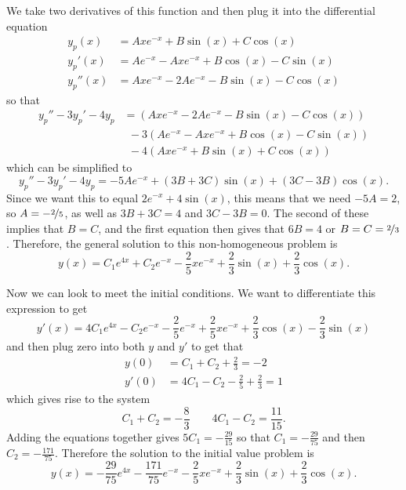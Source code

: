\begin{exampleSol}
We take two derivatives of this function and then plug it into the differential equation
\begin{equation*}
\begin{split}
y_p(x) &= Axe^{-x} + B\sin(x) + C\cos(x) \\
y_p'(x) &= Ae^{-x} - Axe^{-x} + B\cos(x) - C\sin(x) \\
y_p''(x) &= Axe^{-x} - 2Ae^{-x} - B\sin(x) - C\cos(x)
\end{split}
\end{equation*}
so that 
\begin{equation*}
\begin{split}
y_p'' - 3y_p' - 4y_p &= (Axe^{-x} - 2Ae^{-x} - B\sin(x) - C\cos(x))\\
&\ \ - 3(Ae^{-x} - Axe^{-x} + B\cos(x) - C\sin(x))\\
& \ \  - 4(Axe^{-x} + B\sin(x) + C\cos(x))
\end{split}
\end{equation*}
which can be simplified to
\begin{equation*}
y_p'' - 3y_p' - 4y_p = -5Ae^{-x} + (3B + 3C)\sin(x) + (3C - 3B)\cos(x).
\end{equation*}
Since we want this to equal $2e^{-x} + 4\sin(x)$, this means that we need $-5A = 2$, so $A = -\nicefrac{2}{5}$, as well as $3B + 3C = 4$ and $3C - 3B = 0$. The second of these implies that $B = C$, and the first equation then gives that $6B = 4$ or $B = C = \nicefrac{2}{3}$. Therefore, the general solution to this non-homogeneous problem is
\begin{equation*}
y(x) = C_1e^{4x} + C_2e^{-x} - \frac{2}{5}xe^{-x} + \frac{2}{3}\sin(x) + \frac{2}{3}\cos(x).
\end{equation*}

Now we can look to meet the initial conditions. We want to differentiate this expression to get
\begin{equation*}
y'(x) = 4C_1e^{4x} - C_2e^{-x} - \frac{2}{5}e^{-x} + \frac{2}{5}xe^{-x} + \frac{2}{3}\cos(x) - \frac{2}{3}\sin(x)
\end{equation*}
and then plug zero into both $y$ and $y'$ to get that
\begin{equation*}
\begin{split}
y(0) &= C_1 + C_2 + \frac{2}{3} = -2 \\
y'(0) &= 4C_1 - C_2 - \frac{2}{5} + \frac{2}{3} = 1
\end{split}
\end{equation*}
which gives rise to the system
\begin{equation*}
C_1 + C_2 = -\frac{8}{3} \qquad 4C_1 - C_2 = \frac{11}{15}.
\end{equation*}
Adding the equations together gives $5C_1 = - \frac{29}{15}$ so that $C_1 = -\frac{29}{75}$ and then $C_2 = -\frac{171}{75}$. Therefore the solution to the initial value problem is
\begin{equation*}
y(x) = -\frac{29}{75}e^{4x} - \frac{171}{75}e^{-x} - \frac{2}{5}xe^{-x} + \frac{2}{3}\sin(x) + \frac{2}{3}\cos(x).
\end{equation*}
\end{exampleSol}

